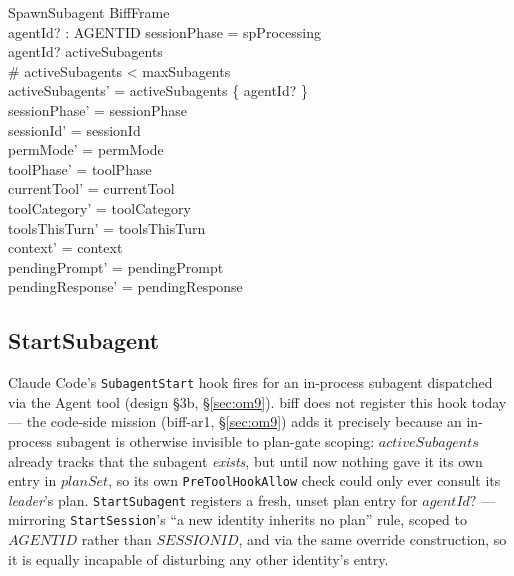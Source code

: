 \documentclass[a4paper,10pt,fleqn]{article}
\begin{document}
\begin{schema}{SpawnSubagent}
  BiffFrame \\
  agentId? : AGENTID
  \where
  sessionPhase = spProcessing \\
  agentId? \notin activeSubagents \\
  \# activeSubagents < maxSubagents \\
  activeSubagents' = activeSubagents \cup \{ agentId? \} \\
  sessionPhase' = sessionPhase \\
  sessionId' = sessionId \\
  permMode' = permMode \\
  toolPhase' = toolPhase \\
  currentTool' = currentTool \\
  toolCategory' = toolCategory \\
  toolsThisTurn' = toolsThisTurn \\
  context' = context \\
  pendingPrompt' = pendingPrompt \\
  pendingResponse' = pendingResponse
\end{schema}

\subsection{StartSubagent}

Claude Code's \texttt{SubagentStart} hook fires for an in-process
subagent dispatched via the Agent tool (design \S3b, \S\ref{sec:om9}).
biff does not register this hook today --- the code-side mission
(biff-ar1, \S\ref{sec:om9}) adds it precisely because an in-process
subagent is otherwise invisible to plan-gate scoping: $activeSubagents$
already tracks that the subagent \emph{exists}, but until now nothing
gave it its own entry in $planSet$, so its own \texttt{PreToolHookAllow}
check could only ever consult its \emph{leader}'s plan.
\texttt{StartSubagent} registers a fresh, unset plan entry for
$agentId?$ --- mirroring \texttt{StartSession}'s ``a new identity
inherits no plan'' rule, scoped to $AGENTID$ rather than $SESSIONID$,
and via the same override construction, so it is equally incapable of
disturbing any other identity's entry.
\end{document}
